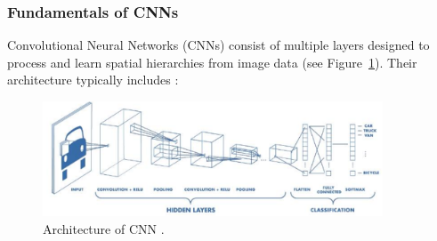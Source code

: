 \subsubsection{Fundamentals of CNNs}
Convolutional Neural Networks (CNNs) consist of multiple layers designed to process and learn spatial hierarchies from image data (see Figure~\ref{fig:figure04}). Their architecture typically includes \parencite{alzubaidi2021review}:

\begin{figure}[H] %
        \centering
        \includegraphics[width=0.9\textwidth]{chapters/chapter1/images/Figure04.png}
        \caption{Architecture of CNN \cite{purwono2022understanding}.}
        \label{fig:figure04}
    \end{figure}

